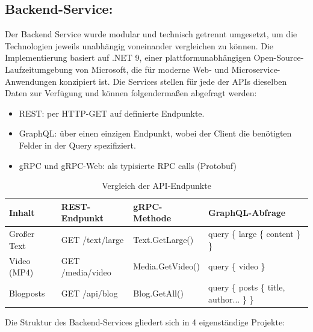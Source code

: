 \subsection{Backend-Service:}

Der Backend Service wurde modular und technisch getrennt umgesetzt, um die Technologien jeweils unabhängig voneinander vergleichen zu können. Die Implementierung basiert auf .NET 9, einer plattformunabhängigen Open-Source-Laufzeitumgebung von Microsoft, die für moderne Web- und Microservice-Anwendungen konzipiert ist.
Die Services stellen für jede der APIs dieselben Daten zur Verfügung und können folgendermaßen abgefragt werden:

\begin{itemize}
	\item REST: per HTTP-GET auf definierte Endpunkte.
	\item GraphQL: über einen einzigen Endpunkt, wobei der Client die benötigten Felder in der Query spezifiziert.
	\item gRPC und gRPC-Web: als typisierte RPC calls (Protobuf) 
\end{itemize}

\begin{table}[h]
	\centering
	\caption{Vergleich der API-Endpunkte}
	\label{tab:api-comparison}
	\renewcommand{\arraystretch}{1.2}
	\setlength{\tabcolsep}{4pt}
	\small
	\begin{tabularx}{\textwidth}{|l|>{\ttfamily}l|>{\ttfamily}l|>{\ttfamily}X|}
		\hline
		\textbf{Inhalt} & \textbf{REST-Endpunkt} & \textbf{gRPC-Methode} & \textbf{GraphQL-Abfrage} \\
		\hline
		Großer Text & GET /text/large & Text.GetLarge() & query \{ large \{ content \} \} \\
		\hline
		Video (MP4) & GET /media/video & Media.GetVideo() & query \{ video \} \\
		\hline
		Blogposts & GET /api/blog & Blog.GetAll() & query \{ posts \{ title, author... \} \} \\
		\hline
	\end{tabularx}
\end{table}




Die Struktur des Backend-Services gliedert sich in 4 eigenständige Projekte:

